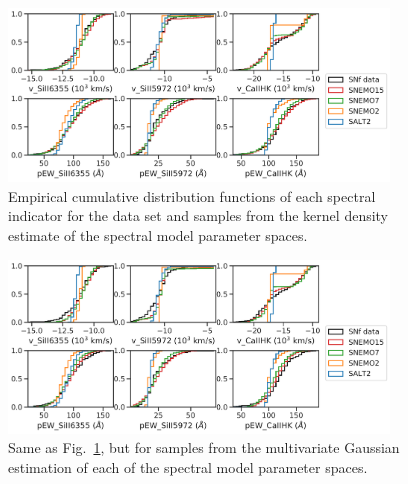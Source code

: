 \begin{figure}
    \centering
    \includegraphics[width=0.9\textwidth]{figures/snemo_kde/ecdf_kde.pdf}
    \caption{Empirical cumulative distribution functions of each spectral indicator for the data set and samples from the kernel density estimate of the spectral model parameter spaces.}
    \label{fig:ecdf_kde}
\end{figure}

\begin{figure}
    \centering
    \includegraphics[width=0.9\textwidth]{figures/snemo_kde/ecdf_gauss.pdf}
    \caption{Same as Fig.~\ref{fig:ecdf_kde}, but for samples from the multivariate Gaussian estimation of each of the spectral model parameter spaces.}
    \label{fig:ecdf_gauss}
\end{figure}


